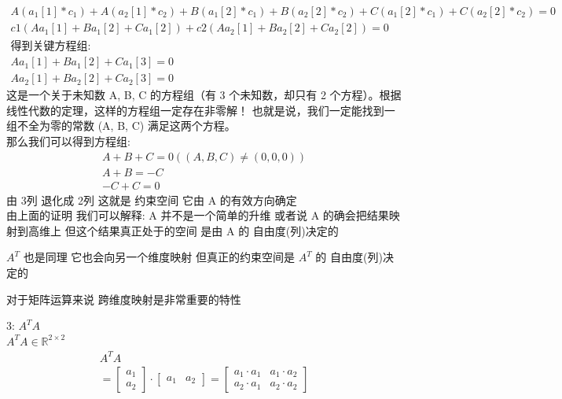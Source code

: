 \documentclass[12pt]{article}
\begin{document}
\begin{flushleft}
\begin{align}
        A(a_{1}[1] * c_{1}) + A(a_{2}[1] * c_{2}) + B(a_{1}[2] * c_{1}) + B(a_{2}[2] * c_{2}) + C(a_{1}[2] * c_{1}) + C(a_{2}[2] * c_{2}) = 0 \\
        c1(Aa_{1}[1] + Ba_{1}[2] + Ca_{1}[2]) +  c2(Aa_{2}[1]  +  Ba_{2}[2] + Ca_{2}[2]) = 0                                                  \\
        \text{得到关键方程组:}                                                                                                                       \\
        A a_{1}[1] + B a_{1}[2] + C a_{1}[3] = 0                                                                                              \\
        A a_{2}[1] + B a_{2}[2] + C a_{2}[3] = 0
    \end{align}
    这是一个关于未知数 A, B, C 的方程组（有 3 个未知数，却只有 2 个方程）。根据线性代数的定理，这样的方程组一定存在非零解！ 也就是说，我们一定能找到一组不全为零的常数 (A, B, C) 满足这两个方程。\\
    那么我们可以得到方程组: \\
    \begin{align}
        A + B + C = 0 ((A, B, C) \neq (0, 0, 0)) \\
        A + B = - C                              \\
        -C + C = 0
    \end{align}
    由 3列 退化成 2列 这就是 约束空间 它由 A 的有效方向确定 \\

    由上面的证明 我们可以解释: A 并不是一个简单的升维 或者说 A 的确会把结果映射到高维上 但这个结果真正处于的空间 是由 A 的 自由度(列)决定的

    $A^{T}$ 也是同理 它也会向另一个维度映射 但真正的约束空间是  $A^{T}$ 的 自由度(列)决定的

    对于矩阵运算来说 跨维度映射是非常重要的特性

    3: $A^{T}A$ \\
    $A^{T}A \in \mathbb{R}^{2 \times 2}$ \\
    \begin{align}
        A^{T}A \\
        = \begin{bmatrix}
              a_{1} \\
              a_{2}
          \end{bmatrix} \cdot \begin{bmatrix}
                                  a_{1} & a_{2}
                              \end{bmatrix}
        = \begin{bmatrix}
              a_{1} \cdot a_{1} & a_{1} \cdot a_{2}  \\
              a_{2} \cdot a_{1} & a_{2}  \cdot a_{2}
          \end{bmatrix}
    \end{align}


\end{flushleft}
\end{document}
